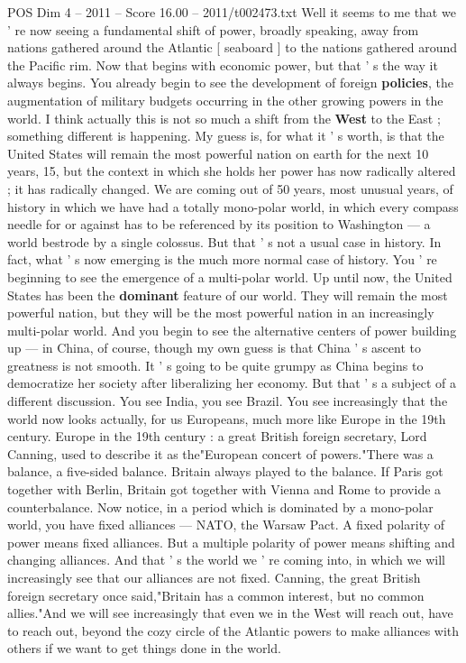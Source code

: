\begin{textsample}{POS Dim 4 – 2011 – Score 16.00 – 2011/t002473.txt}
Well it seems to me that we ' re now seeing a fundamental shift of power, broadly speaking, away from nations gathered around the Atlantic [ seaboard ] to the nations gathered around the Pacific rim.
Now that begins with economic power, but that ' s the way it always begins.
You already begin to see the development of foreign \textbf{policies}, the augmentation of military budgets occurring in the other growing powers in the world.
I think actually this is not so much a shift from the \textbf{West} to the East ; something different is happening.
My guess is, for what it ' s worth, is that the United States will remain the most powerful nation on earth for the next 10 years, 15, but the context in which she holds her power has now radically altered ; it has radically changed.
We are coming out of 50 years, most unusual years, of history in which we have had a totally mono-polar world, in which every compass needle for or against has to be referenced by its position to Washington — a world bestrode by a single colossus.
But that ' s not a usual case in history.
In fact, what ' s now emerging is the much more normal case of history.
You ' re beginning to see the emergence of a multi-polar world.
Up until now, the United States has been the \textbf{dominant} feature of our world.
They will remain the most powerful nation, but they will be the most powerful nation in an increasingly multi-polar world.
And you begin to see the alternative centers of power building up — in China, of course, though my own guess is that China ' s ascent to greatness is not smooth.
It ' s going to be quite grumpy as China begins to democratize her society after liberalizing her economy.
But that ' s a subject of a different discussion.
You see India, you see Brazil.
You see increasingly that the world now looks actually, for us Europeans, much more like Europe in the 19th century.
Europe in the 19th century : a great British foreign secretary, Lord Canning, used to describe it as the"European concert of powers."There was a balance, a five-sided balance.
Britain always played to the balance.
If Paris got together with Berlin, Britain got together with Vienna and Rome to provide a counterbalance.
Now notice, in a period which is dominated by a mono-polar world, you have fixed alliances — NATO, the Warsaw Pact.
A fixed polarity of power means fixed alliances.
But a multiple polarity of power means shifting and changing alliances.
And that ' s the world we ' re coming into, in which we will increasingly see that our alliances are not fixed.
Canning, the great British foreign secretary once said,"Britain has a common interest, but no common allies."And we will see increasingly that even we in the West will reach out, have to reach out, beyond the cozy circle of the Atlantic powers to make alliances with others if we want to get things done in the world.

\end{textsample}
